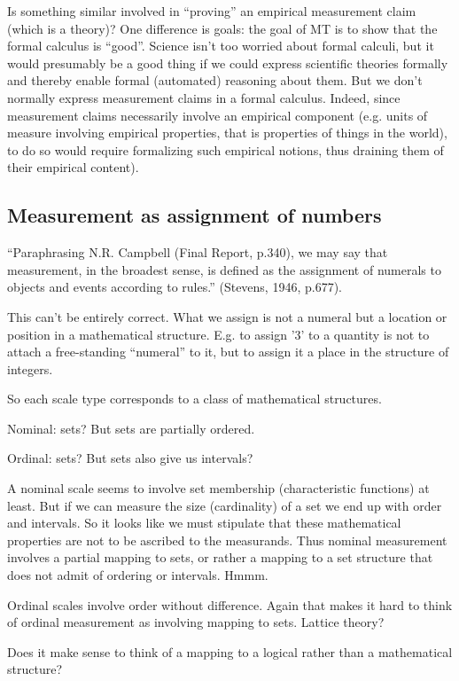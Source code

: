 \documentclass[11pt,twoside]{article}
\begin{document}
\begin{appendices}
Is something similar involved in ``proving'' an empirical measurement
claim (which is a theory)?  One difference is goals: the goal of MT is
to show that the formal calculus is ``good''.  Science isn't too
worried about formal calculi, but it would presumably be a good thing
if we could express scientific theories formally and thereby enable
formal (automated) reasoning about them.  But we don't normally
express measurement claims in a formal calculus.  Indeed, since
measurement claims necessarily involve an empirical component
(e.g. units of measure involving empirical properties, that is
properties of things in the world), to do so would require formalizing
such empirical notions, thus draining them of their empirical
content).

\subsection{Measurement as assignment of numbers}

``Paraphrasing N.R. Campbell (Final Report, p.340), we may say that
measurement, in the broadest sense, is defined as the assignment of
numerals to objects and events according to rules.'' (Stevens, 1946,
p.677).

This can't be entirely correct.  What we assign is not a numeral but a
location or position in a mathematical structure.  E.g. to assign '3'
to a quantity is not to attach a free-standing ``numeral'' to it, but
to assign it a place in the structure of integers.

So each scale type corresponds to a class of mathematical structures.

Nominal:  sets?  But sets are partially ordered.

Ordinal:  sets?  But sets also give us intervals?

A nominal scale seems to involve set membership (characteristic
functions) at least.  But if we can measure the size (cardinality) of
a set we end up with order and intervals.  So it looks like we must
stipulate that these mathematical properties are not to be ascribed to
the measurands.  Thus nominal measurement involves a partial mapping
to sets, or rather a mapping to a set structure that does not admit of
ordering or intervals.  Hmmm.

Ordinal scales involve order without difference.  Again that makes it
hard to think of ordinal measurement as involving mapping to sets.
Lattice theory?

Does it make sense to think of a mapping to a logical rather than a
mathematical structure?


\end{appendices}
\end{document}
